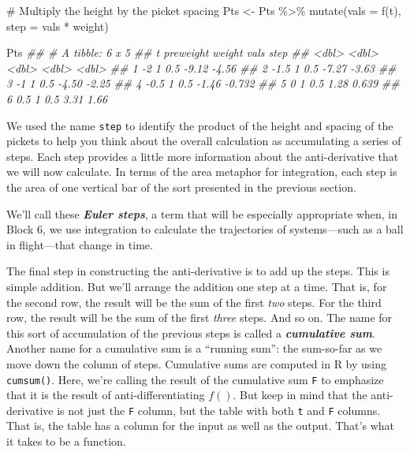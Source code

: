 \documentclass[
  letterpaper,
  DIV=11,
  numbers=noendperiod,
  oneside]{scrreprt}
\newenvironment{Shaded}{\begin{snugshade}}{\end{snugshade}}
\newcommand{\AttributeTok}[1]{\textcolor[rgb]{0.40,0.46,0.14}{#1}}
\newcommand{\CommentTok}[1]{\textcolor[rgb]{0.37,0.37,0.37}{#1}}
\newcommand{\DocumentationTok}[1]{\textcolor[rgb]{0.37,0.37,0.37}{\textit{#1}}}
\newcommand{\FunctionTok}[1]{\textcolor[rgb]{0.28,0.35,0.67}{#1}}
\newcommand{\NormalTok}[1]{\textcolor[rgb]{0.00,0.46,0.62}{#1}}
\newcommand{\OtherTok}[1]{\textcolor[rgb]{0.00,0.46,0.62}{#1}}
\newcommand{\SpecialCharTok}[1]{\textcolor[rgb]{0.37,0.37,0.37}{#1}}
\begin{document}
\begin{Shaded}
\begin{Highlighting}[]
\CommentTok{\# Multiply the height by the picket spacing}
\NormalTok{Pts }\OtherTok{\textless{}{-}}\NormalTok{ Pts }\SpecialCharTok{\%\textgreater{}\%}
  \FunctionTok{mutate}\NormalTok{(}\AttributeTok{vals =} \FunctionTok{f}\NormalTok{(t),}
         \AttributeTok{step =}\NormalTok{ vals }\SpecialCharTok{*}\NormalTok{ weight)}
\end{Highlighting}
\end{Shaded}

\begin{Shaded}
\begin{Highlighting}[]
\NormalTok{Pts}
\DocumentationTok{\#\# \# A tibble: 6 x 5}
\DocumentationTok{\#\#       t preweight weight  vals   step}
\DocumentationTok{\#\#   \textless{}dbl\textgreater{}     \textless{}dbl\textgreater{}  \textless{}dbl\textgreater{} \textless{}dbl\textgreater{}  \textless{}dbl\textgreater{}}
\DocumentationTok{\#\# 1  {-}2           1    0.5 {-}9.12 {-}4.56 }
\DocumentationTok{\#\# 2  {-}1.5         1    0.5 {-}7.27 {-}3.63 }
\DocumentationTok{\#\# 3  {-}1           1    0.5 {-}4.50 {-}2.25 }
\DocumentationTok{\#\# 4  {-}0.5         1    0.5 {-}1.46 {-}0.732}
\DocumentationTok{\#\# 5   0           1    0.5  1.28  0.639}
\DocumentationTok{\#\# 6   0.5         1    0.5  3.31  1.66}
\end{Highlighting}
\end{Shaded}

We used the name \texttt{step} to identify the product of the height and
spacing of the pickets to help you think about the overall calculation
as accumulating a series of steps. Each step provides a little more
information about the anti-derivative that we will now calculate. In
terms of the area metaphor for integration, each step is the area of one
vertical bar of the sort presented in the previous section.

We'll call these \textbf{\emph{Euler steps}}, a term that will be
especially appropriate when, in Block 6, we use integration to calculate
the trajectories of systems---such as a ball in flight---that change in
time.

The final step in constructing the anti-derivative is to add up the
steps. This is simple addition. But we'll arrange the addition one step
at a time. That is, for the second row, the result will be the sum of
the first \emph{two} steps. For the third row, the result will be the
sum of the first \emph{three} steps. And so on. The name for this sort
of accumulation of the previous steps is called a
\textbf{\emph{cumulative sum}}. Another name for a cumulative sum is a
``running sum'': the sum-so-far as we move down the column of steps.
Cumulative sums are computed in R by using \texttt{cumsum()}. Here,
we're calling the result of the cumulative sum \texttt{F} to emphasize
that it is the result of anti-differentiating \(f()\). But keep in mind
that the anti-derivative is not just the \texttt{F} column, but the
table with both \texttt{t} and \texttt{F} columns. That is, the table
has a column for the input as well as the output. That's what it takes
to be a function.
\end{document}
